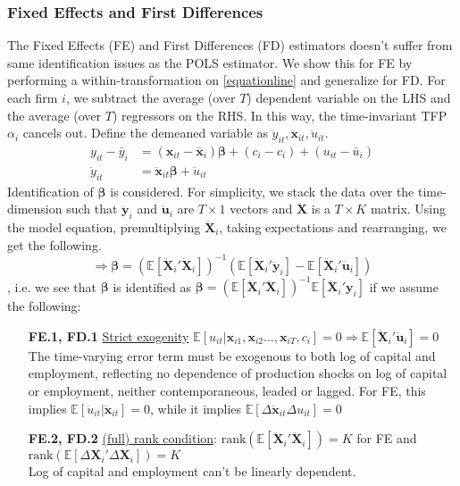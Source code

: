 \subsubsection*{Fixed Effects and First Differences}
The Fixed Effects (FE) and First Differences (FD) estimators doesn't suffer from same identification issues as the POLS estimator. We show this for FE by performing a within-transformation on \eqref{equationline} and generalize for FD. For each firm $i$, we subtract the average (over $T$) dependent variable  on the LHS and the average (over $T$) regressors on the RHS. In this way, the time-invariant TFP $\alpha_i$ cancels out. Define the demeaned variable as $ \ddot{y}_{it}, \pmb{\ddot{x}}_{it}, \ddot{u}_{it}$.
\begin{align*}
    y_{it}-\bar{y}_{i} &=(\pmb{x}_{it}-\bar{\pmb{x}}_{i}) \pmb{\beta}+(c_i-c_i)+(u_{it} - \bar{u}_{i}) \\
    \ddot{y}_{it} &=  \ddot{\pmb{x}}_{it} \pmb{\beta}+\ddot{u}_{it}
\end{align*}
Identification of $\pmb{\beta}$ is considered. For simplicity, we stack the data over the time-dimension such that $\ddot{\pmb{y}}_{i}$ and $\ddot{\pmb{u}}_{i}$ are $T \times 1$ vectors and $\pmb{\ddot{X}}$ is a $T\times K$ matrix. Using the model equation, premultiplying $\pmb{\ddot{X}}_{i}$, taking expectations and rearranging, we get the following.
$$ \Rightarrow  \pmb{\beta} = (\mathbb{E}[\pmb{\ddot{X}}_{i}'\pmb{\ddot{X}}_{i}])^{-1} \left(  \mathbb{E}[\pmb{\ddot{X}}_{i}'\pmb{\ddot{y}}_{i}]-\mathbb{E}[\pmb{\ddot{X}}_{i}' \pmb{\ddot{u}}_{i}]\right)$$
, i.e. we see that $\pmb{\beta}$ is identified as $\pmb{\beta} = (\mathbb{E}[\pmb{\ddot{X}}_{i}'\pmb{\ddot{X}}_{i}])^{-1} \mathbb{E}[\pmb{\ddot{X}}_{i}'\pmb{y}_{i}]$ if we assume the following:
\begin{enumerate}
    \item[\textbf{FE.1, FD.1}] \underline{Strict exogenity} $\mathbb{E}[u_{it}\vert \pmb{x}_{i1},\pmb{x}_{i2}\dots,\pmb{x}_{iT},c_i]=0\Rightarrow \mathbb{E}[\pmb{\ddot{X}}_{i}' \pmb{\ddot{u}}_{i}]=0$ \\
    The time-varying error term must be exogenous to both log of capital and employment, reflecting no dependence of production shocks on log of capital or employment, neither contemporaneous, leaded or lagged. For FE, this implies $\mathbb{E}[ \ddot{u}_{it} \vert\pmb{\ddot{x}}_{it}]=0$, while it implies $\mathbb{E}[\Delta \pmb{\ddot{x}}_{it} \Delta u_{it}]=0$
    \item[\textbf{FE.2, FD.2}] \underline{ (full) rank condition}: $\text{rank}(\mathbb{E}[\pmb{\ddot{X}}_{i}'\pmb{\ddot{X}}_{i}])=K$ for FE and $\text{rank}(\mathbb{E}[\Delta\pmb{X}_{i}' \Delta\pmb{X}_{i}])=K$ \\
    Log of capital and employment can't be linearly dependent.
\end{enumerate}

